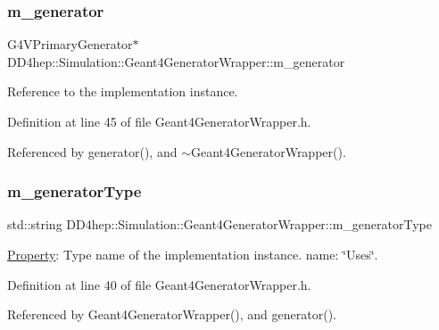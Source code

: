 \subsubsection{\texorpdfstring{m\+\_\+generator}{m\_generator}}
{\footnotesize\ttfamily G4\+V\+Primary\+Generator$\ast$ D\+D4hep\+::\+Simulation\+::\+Geant4\+Generator\+Wrapper\+::m\+\_\+generator\hspace{0.3cm}{\ttfamily [protected]}}



Reference to the implementation instance. 



Definition at line 45 of file Geant4\+Generator\+Wrapper.\+h.



Referenced by generator(), and $\sim$\+Geant4\+Generator\+Wrapper().

\hypertarget{class_d_d4hep_1_1_simulation_1_1_geant4_generator_wrapper_aa1ee2aa3cf2f158fe49c786af37b46f0}{}\label{class_d_d4hep_1_1_simulation_1_1_geant4_generator_wrapper_aa1ee2aa3cf2f158fe49c786af37b46f0} 
\subsubsection{\texorpdfstring{m\+\_\+generator\+Type}{m\_generatorType}}
{\footnotesize\ttfamily std\+::string D\+D4hep\+::\+Simulation\+::\+Geant4\+Generator\+Wrapper\+::m\+\_\+generator\+Type\hspace{0.3cm}{\ttfamily [protected]}}



\hyperlink{class_d_d4hep_1_1_property}{Property}\+: Type name of the implementation instance. name\+: \char`\"{}\+Uses\char`\"{}. 



Definition at line 40 of file Geant4\+Generator\+Wrapper.\+h.



Referenced by Geant4\+Generator\+Wrapper(), and generator().

\hypertarget{class_d_d4hep_1_1_simulation_1_1_geant4_generator_wrapper_a92bb07f3c2f7c34dc8f55290716c64b1}{}\label{class_d_d4hep_1_1_simulation_1_1_geant4_generator_wrapper_a92bb07f3c2f7c34dc8f55290716c64b1} 
